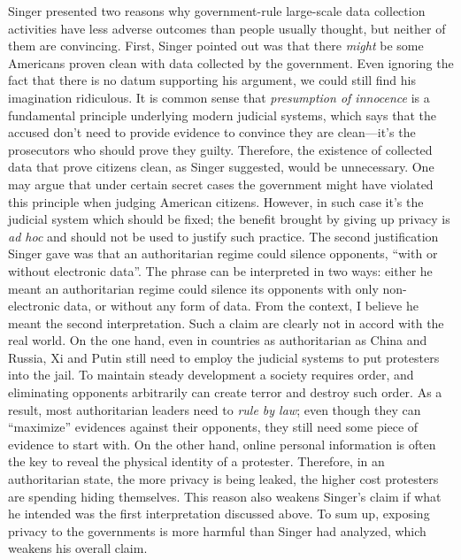 \documentclass{writing}
\begin{document}
Singer presented two reasons why government-rule large-scale data
collection activities have less adverse outcomes than people usually
thought, but neither of them are convincing. First, Singer pointed out
was that there \emph{might} be some Americans proven clean with data
collected by the government. Even ignoring the fact that there is no
datum supporting his argument, we could still find his imagination
ridiculous. It is common sense that \emph{presumption of innocence} is a
fundamental principle underlying modern judicial systems, which says
that the accused don't need to provide evidence to convince they are
clean---it's the prosecutors who should prove they guilty. Therefore,
the existence of collected data that prove citizens clean, as Singer
suggested, would be unnecessary. One may argue that under certain secret
cases the government might have violated this principle when judging
American citizens. However, in such case it's the judicial system which
should be fixed; the benefit brought by giving up privacy is \emph{ad
hoc} and should not be used to justify such practice. The second
justification Singer gave was that an authoritarian regime could silence
opponents, ``with or without electronic data''. The phrase can be
interpreted in two ways: either he meant an authoritarian regime could
silence its opponents with only non-electronic data, or without any form
of data. From the context, I believe he meant the second interpretation.
Such a claim are clearly not in accord with the real world. On the one
hand, even in countries as authoritarian as China and Russia, Xi and
Putin still need to employ the judicial systems to put protesters into
the jail. To maintain steady development a society requires order, and
eliminating opponents arbitrarily can create terror and destroy such
order. As a result, most authoritarian leaders need to \emph{rule by
law}; even though they can ``maximize'' evidences against their
opponents, they still need some piece of evidence to start with. On the
other hand, online personal information is often the key to reveal the
physical identity of a protester. Therefore, in an authoritarian state,
the more privacy is being leaked, the higher cost protesters are
spending hiding themselves. This reason also weakens Singer's claim if
what he intended was the first interpretation discussed above. To sum
up, exposing privacy to the governments is more harmful than Singer had
analyzed, which weakens his overall claim.
\end{document}
